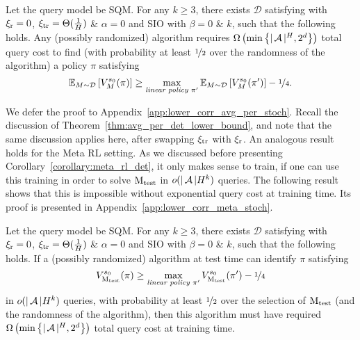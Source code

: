 \documentclass[11pt,twoside]{article}
\begin{document}
\begin{corollary}
\label{corollary:avg_per_stoch}
Let the query model be SQM. For any $k \geq 3$, there exists $\mathcal{D}$ satisfying \weakprox{} with $\operatorname{\xi_r} =0$, $\operatorname{\xi_{tr}} = \Theta(\frac{1}{H})$ \& $\alpha = 0$ and SIO with $\beta = 0$ \& $k$, such that the following holds. Any (possibly randomized) algorithm requires $\Omega \left( \min \left \{ \vert \operatorname{\mathcal{A}} \vert^H, 2^d \right \} \right)$ total query cost to find (with probability at least $\nicefrac{1}{2}$ over the randomness of the algorithm) a policy $\pi$ satisfying
\begin{equation*}
\operatorname{\mathbb{E}}_{M \sim \mathcal{D}} \left[ V^{{s_0 }}_{{M }}({\pi}) \right] \geq \max_{\emph{\text{linear policy }} \pi'} \operatorname{\mathbb{E}}_{M \sim \mathcal{D}} \left[ V^{{s_0 }}_{{M }}({\pi'}) \right] - \nicefrac{1}{4}.
\end{equation*}
\end{corollary}
We defer the proof to Appendix~\ref{app:lower_corr_avg_per_stoch}. Recall the discussion of Theorem~\ref{thm:avg_per_det_lower_bound}, and note that the same discussion applies here, after swapping $\operatorname{\xi_{tr}}$ with $\operatorname{\xi_r}$. An analogous result holds for the Meta RL setting. As we discussed before presenting Corollary~\ref{corollary:meta_rl_det}, it only makes sense to train, if one can use this training in order to solve $\operatorname{M_{test}}$ in $o(\vert \operatorname{\mathcal{A}} \vert H^k)$ queries. The following result shows that this is impossible without exponential query cost at training time. Its proof is presented in Appendix~\ref{app:lower_corr_meta_stoch}.\begin{corollary}
\label{corollary:meta_rl_stoch}
Let the query model be SQM. For any $k \geq 3$, there exists $\mathcal{D}$ satisfying \weakprox{} with $\operatorname{\xi_r} =0$, $\operatorname{\xi_{tr}} = \Theta(\frac{1}{H})$ \& $\alpha = 0$ and SIO with $\beta = 0$ \& $k$, such that the following holds. If a (possibly randomized) algorithm at test time can identify $\pi$ satisfying
\begin{equation*}
V^{{s_0 }}_{{\operatorname{M_{test}} }}({\pi}) \geq \max_{\emph{\text{linear policy }} \pi'} V^{{s_0 }}_{{\operatorname{M_{test}} }}({\pi'}) - \nicefrac{1}{4}
\end{equation*}
in $o(\vert \operatorname{\mathcal{A}} \vert H^k)$ queries, with probability at least $\nicefrac{1}{2}$ over the selection of $\operatorname{M_{test}}$ (and the randomness of the algorithm), then this algorithm must have required $\Omega \left( \min \left \{ \vert \operatorname{\mathcal{A}} \vert^H, 2^d \right \} \right)$ total query cost at training time.
\end{corollary}
\end{document}
